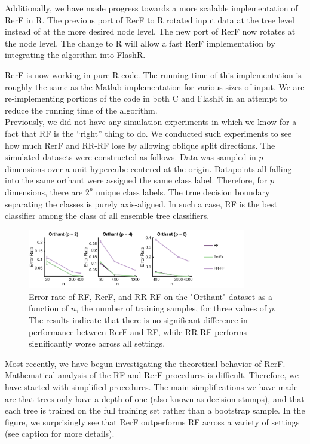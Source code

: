 \documentclass[simplex.tex]{subfiles}
\begin{document}
Additionally, we have made progress towards a more scalable implementation of RerF in R. The previous port of RerF to R rotated input data at the tree level instead 
of at the more desired node level.  The new port of RerF now rotates at the
node level.  The change to R will allow a fast RerF implementation by 
integrating the algorithm into FlashR.


\clearpage

RerF is now working in pure R code.  The running time of this
implementation is roughly the same as the Matlab implementation for
various sizes of input.  We are re-implementing portions of the code in
both C and FlashR in an attempt to reduce the running time of the
algorithm. \\


Previously, we did not have any simulation experiments in which we know
for a fact that RF is the ``right'' thing to do. We conducted such
experiments to see how much RerF and RR-RF lose by allowing oblique
split directions. The simulated datasets were constructed as follows.
Data was sampled in $p$ dimensions over a unit hypercube centered at the
origin. Datapoints all falling into the same orthant were assigned the
same class label. Therefore, for $p$ dimensions, there are $2^p$ unique
class labels. The true decision boundary separating the classes is
purely axis-aligned. In such a case, RF is the best classifier among the
class of all ensemble tree classifiers.

\begin{figure}[!h]
\begin{cframed}
\centering
\includegraphics[width=0.85\textwidth]{../../figs/RerF_2017_02.png}
\caption{Error rate of RF, RerF, and RR-RF on the "Orthant" dataset as a
  function of $n$, the number of training samples, for three values of
  $p$. The results indicate that there is no significant difference in
  performance between RerF and RF, while RR-RF performs significantly
  worse across all settings.}
\label{fig:name}
\end{cframed}
\end{figure}


\clearpage
Most recently, we have begun investigating the theoretical behavior of RerF. Mathematical analysis of the RF and RerF procedures is difficult. Therefore, we have started with simplified procedures. The main simplifications we have made are that trees only have a depth of one (also known as decision stumps), and that each tree is trained on the full training set rather than a bootstrap sample. In the figure, we surprisingly see that RerF outperforms RF across a variety of settings (see caption for more details).
\end{document}
